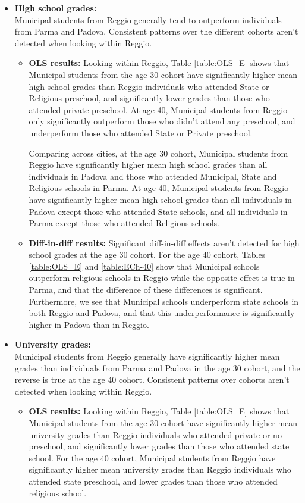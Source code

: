 \documentclass[11pt]{article}
\begin{document}
\begin{itemize}
\begin{itemize}
	\end{itemize}
	
\item \textbf{High school grades:} \\
Municipal students from Reggio generally tend to outperform individuals from Parma and Padova. Consistent patterns over the different cohorts aren't detected when looking within Reggio.
	\begin{itemize}
	\item \textbf{OLS results:} Looking within Reggio, Table \ref{table:OLS_E} shows that Municipal students from the age 30 cohort have significantly higher mean high school grades than Reggio individuals who attended State or Religious preschool, and significantly lower grades than those who attended private preschool. At age 40, Municipal students from Reggio only significantly outperform those who didn't attend any preschool, and underperform those who attended State or Private preschool. 

Comparing across cities, at the age 30 cohort, Municipal students from Reggio  have significantly higher mean high school grades than all individuals in Padova and those who attended Municipal, State and Religious schools in Parma. At age 40,  Municipal students from Reggio  have significantly higher mean high school grades than all individuals in Padova except those who attended State schools, and all individuals in Parma except those who attended Religious schools.

	\item \textbf{Diff-in-diff results:}  Significant diff-in-diff effects aren't detected for high school grades at the age 30 cohort.	For the age 40 cohort, Tables \ref{table:OLS_E} and \ref{table:ECh-40} show that Municipal schools outperform religious schools in Reggio while the opposite effect is true in Parma, and that the difference of these differences is significant. Furthermore, we see that Municipal schools underperform state schools in both Reggio and Padova, and that this underperformance is significantly higher in Padova than in Reggio.

\end{itemize}


\item \textbf{University grades:} \\
Municipal students from Reggio generally have significantly higher mean grades than individuals from Parma and Padova in the age 30 cohort, and the reverse is true at the age 40 cohort. Consistent patterns over cohorts aren't detected when looking within Reggio.
	\begin{itemize}
	\item \textbf{OLS results:} Looking within Reggio, Table \ref{table:OLS_E} shows that Municipal students from the age 30 cohort have significantly higher mean university grades than Reggio individuals who attended private or no preschool, and significantly lower grades than those who attended state school. For the age 40 cohort, Municipal students from Reggio have significantly higher mean university grades than Reggio individuals who attended state preschool, and  lower grades than those who attended religious school.


\end{itemize}
\end{itemize}
\end{document}
